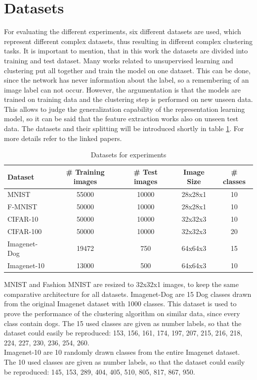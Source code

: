 \documentclass[12pt,DIV14,BCOR12mm,a4paper,footexclude,headinclude,halfparskip-,twoside,openright,cleardoubleempty,idxtotoc,bibtotoc,listtotoc,abstracton]{scrreprt} %
\numberwithin{equation}{chapter}
\begin{document}
\section{Datasets}
For evaluating the different experiments, six different datasets are used, which represent different complex datasets, thus resulting in different complex clustering tasks. It is important to mention, that in this work the datasets are divided into training and test dataset. Many works related to unsupervised learning and clustering put all together and train the model on one dataset. This can be done, since the network has never information about the label, so a remembering of an image label can not occur. However, the argumentation is that the models are trained on training data and the clustering step is performed on new unseen data. This allows to judge the generalization capability of the representation learning model, so it can be said that the feature extraction works also on unseen test data. The datasets and their splitting will be introduced shortly in table \ref{tab:Datasets}. For more details refer to the linked papers.
\begin{table}[htb!]
    \centering
    \caption{Datasets for experiments}
    \label{tab:Datasets}
    \begin{tabular}{lcccc}
        \toprule
        Dataset & \# Training images & \# Test images & Image Size & \# classes\\
        \midrule
        MNIST \cite{MNIST-Data} & 55000 & 10000 & 28x28x1 & 10\\
        F-MNIST \cite{xiao17F-MNIST} & 50000 & 10000 & 28x28x1 & 10\\
        CIFAR-10 \cite{Krizhevsky09CIFAR} & 50000 & 10000 & 32x32x3 & 10\\
        CIFAR-100 \cite{Krizhevsky09CIFAR} & 50000 & 10000 & 32x32x3 & 20\\
        Imagenet-Dog \cite{imagenet_cvpr09} & 19472 & 750 & 64x64x3 & 15\\
        Imagenet-10 \cite{imagenet_cvpr09} & 13000 & 500 & 64x64x3 & 10\\
        \bottomrule
    \end{tabular}
\end{table}
MNIST and Fashion MNIST are resized to 32x32x1 images, to keep the same comparative architecture for all datasets. Imagenet-Dog are 15 Dog classes drawn from the original Imagenet dataset with 1000 classes. This dataset is used to prove the performance of the clustering algorithm on similar data, since every class contain dogs. The 15 used classes are given as number labels, so that the dataset could easily be reproduced: 153, 156, 161, 174, 197, 207, 215, 216, 218, 224, 227, 230, 236, 254, 260.\\
Imagenet-10 are 10 randomly drawn classes from the entire Imagenet dataset. The 10 used classes are given as number labels, so that the dataset could easily be reproduced: 145, 153, 289, 404, 405, 510, 805, 817, 867, 950.
\end{document}
